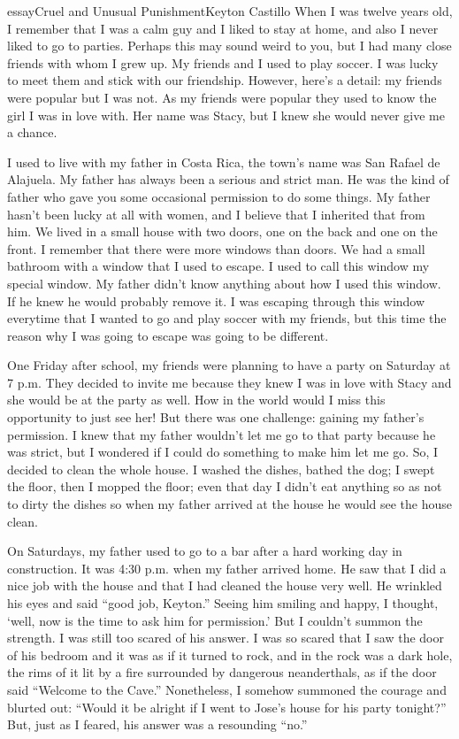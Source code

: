 \begin{prose}{essay}{Cruel and Unusual Punishment}{Keyton Castillo}
When I was twelve years old, I remember that I was a calm guy and I liked to stay at home, and also I never liked to go to parties. Perhaps this may sound weird to you, but I had many close friends with whom I grew up. My friends and  I used to play soccer.  I was lucky to meet them and stick with our friendship. However, here's a detail: my friends were popular but I was not. As my friends were popular they used to know the girl I was in love with. Her name was Stacy, but I knew she would never give me a chance.\par
I used to live with my father in Costa Rica, the town's name was San Rafael de Alajuela. My father has always been a serious and strict man. He was the kind of father who gave you some occasional permission to do some things. My father hasn't been lucky at all with women, and I believe that I inherited that from him. We lived in a small house with two doors, one on the back and one on the front. I remember that there were more windows than doors. We had a small bathroom with a window that I used to escape. I used to call this window my special window. My father didn't know anything about how I used this window. If he knew he would probably remove it. I was escaping through this window everytime that I wanted to go and play soccer with my friends, but this time the reason why I was going to escape was going to be different.\par
One Friday after school, my friends were planning to have a party on Saturday at 7 p.m. They decided to invite me because they knew I was in love with Stacy and she would be at the party as well. How in the world would I miss this opportunity to just see her! But there was one challenge: gaining my father's permission. I knew that my father wouldn't let me go to that party because he was strict, but I wondered if I could do something to make him let me go. So, I decided to clean the whole house. I washed the dishes, bathed the dog; I swept the floor, then I mopped the floor; even that day I didn't eat anything so as not to dirty the dishes so when my father arrived at the house he would see the house clean. \par
On Saturdays, my father used to go to a bar after a hard working day in construction. It was 4:30 p.m. when my father arrived home. He saw that I did a nice job with the house and that I had cleaned the house very well. He wrinkled his eyes and said “good job, Keyton.” Seeing him smiling and happy, I thought, `well, now is the time to ask him for permission.' But I couldn't summon the strength. I was still too scared of his answer. I was so scared that I saw the door of his bedroom and it was as if it turned to rock, and in the rock was a dark hole, the rims of it lit by a fire surrounded by dangerous neanderthals, as if the door said “Welcome to the Cave.” Nonetheless, I somehow summoned the courage and blurted out: “Would it be alright if I went to Jose's house for his party tonight?” But, just as I feared, his answer was a resounding “no.” \par

\end{prose}
